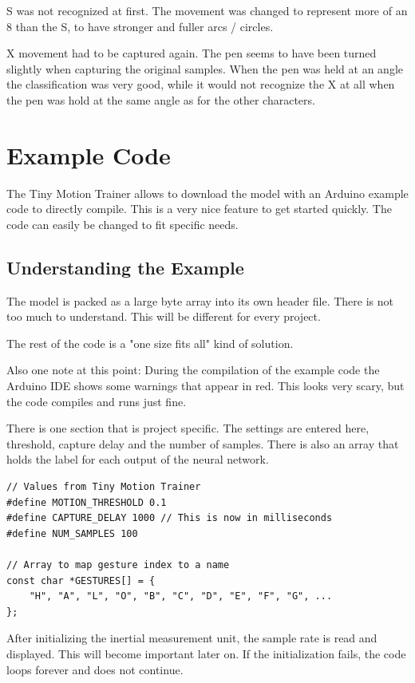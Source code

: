 \documentclass[a4paper,titlepage]{article}
\begin{document}
S was not recognized at first.
The movement was changed to represent more of an 8 than the S, to have stronger and fuller arcs / circles.

X movement had to be captured again.
The pen seems to have been turned slightly when capturing the original samples.
When the pen was held at an angle the classification was very good, while it would not recognize the X at all when the pen was hold at the same angle as for the other characters.

\newpage
\section{Example Code}

The Tiny Motion Trainer allows to download the model with an Arduino example code to directly compile.
This is a very nice feature to get started quickly.
The code can easily be changed to fit specific needs.

\subsection{Understanding the Example}

The model is packed as a large byte array into its own header file.
There is not too much to understand.
This will be different for every project.

The rest of the code is a "one size fits all" kind of solution.

Also one note at this point: During the compilation of the example code the Arduino IDE shows some warnings that appear in red.
This looks very scary, but the code compiles and runs just fine.

There is one section that is project specific.
The settings are entered here, threshold, capture delay and the number of samples.
There is also an array that holds the label for each output of the neural network.

\begin{lstlisting}
// Values from Tiny Motion Trainer
#define MOTION_THRESHOLD 0.1
#define CAPTURE_DELAY 1000 // This is now in milliseconds
#define NUM_SAMPLES 100

// Array to map gesture index to a name
const char *GESTURES[] = {
    "H", "A", "L", "O", "B", "C", "D", "E", "F", "G", ...
};
\end{lstlisting}

After initializing the inertial measurement unit, the sample rate is read and displayed.
This will become important later on.
If the initialization fails, the code loops forever and does not continue.
\end{document}
